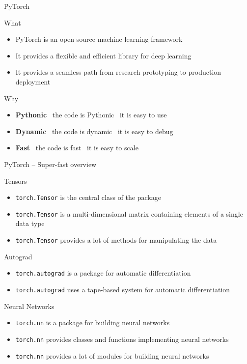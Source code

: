\documentclass[presentation, 9pt]{beamer}\mode<presentation>{\usetheme{AMSBolognaFC}}
\begin{document}
\begin{frame}{PyTorch}
	\begin{block}{What}
		\begin{itemize}
			\item PyTorch is an open source machine learning framework
			\item It provides a flexible and efficient library for deep learning
			\item It provides a seamless path from research prototyping to production deployment
		\end{itemize}
	\end{block}
	\begin{block}{Why}
		\begin{itemize}
			\item \textbf{Pythonic} \faArrowRight \, the code is Pythonic \faArrowRight \, it is easy to use
			\item \textbf{Dynamic} \faArrowRight \, the code is dynamic \faArrowRight \, it is easy to debug
			\item \textbf{Fast} \faArrowRight \, the code is fast \faArrowRight \, it is easy to scale
		\end{itemize}
	\end{block}
\end{frame}
\begin{frame}{PyTorch -- Super-fast overview}
	\begin{block}{Tensors}
		\begin{itemize}
			\item \texttt{torch.Tensor} is the central class of the package
			\item \texttt{torch.Tensor} is a multi-dimensional matrix containing elements of a single data type
			\item \texttt{torch.Tensor} provides a lot of methods for manipulating the data
		\end{itemize}
	\end{block}
	\begin{block}{Autograd}
		\begin{itemize}
			\item \texttt{torch.autograd} is a package for automatic differentiation
			\item \texttt{torch.autograd} uses a tape-based system for automatic differentiation
		\end{itemize}
	\end{block}
	\begin{block}{Neural Networks}
		\begin{itemize}
			\item \texttt{torch.nn} is a package for building neural networks
			\item \texttt{torch.nn} provides classes and functions implementing neural networks
			\item \texttt{torch.nn} provides a lot of modules for building neural networks
		\end{itemize}
	\end{block}
\end{frame}
\end{document}
